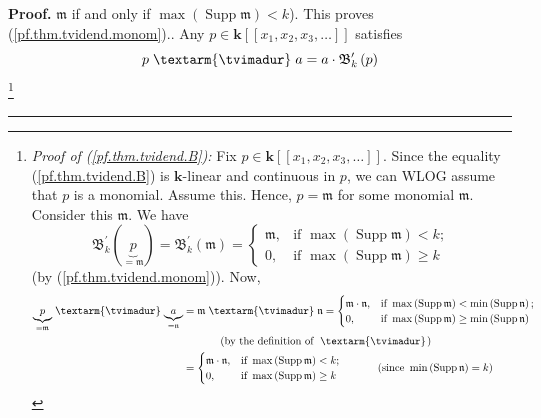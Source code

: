\documentclass
[numbers=enddot,12pt,final,onecolumn,notitlepage,abstracton]{scrartcl}%
\theoremstyle{definition}
\newenvironment{proof}[1][Proof]{\noindent\textbf{#1.} }{\ \rule{0.5em}{0.5em}}
\newenvironment{verlong}{}{}
\newcommand{\tvi}{\left. \textarm{\tvimadur} \right.}
\begin{document}
\begin{verlong}
\begin{proof}
{$\mathfrak{m}$ if and only if $\max\left(  \operatorname*{Supp}\mathfrak{m}%
\right)  <k$). This proves (\ref{pf.thm.tvidend.monom}).}. Any $p\in
\mathbf{k}\left[  \left[  x_{1},x_{2},x_{3},\ldots\right]  \right]  $
satisfies%
\begin{equation}
p \tvi a=a\cdot\mathfrak{B}_{k}^{\prime}\left(  p\right)
\label{pf.thm.tvidend.B}%
\end{equation}
\footnote{\textit{Proof of (\ref{pf.thm.tvidend.B}):} Fix $p\in\mathbf{k}%
\left[  \left[  x_{1},x_{2},x_{3},\ldots\right]  \right]  $. Since the
equality (\ref{pf.thm.tvidend.B}) is $\mathbf{k}$-linear and continuous in
$p$, we can WLOG assume that $p$ is a monomial. Assume this. Hence,
$p=\mathfrak{m}$ for some monomial $\mathfrak{m}$. Consider this
$\mathfrak{m}$. We have%
\begin{equation}
\mathfrak{B}_{k}^{\prime}\left(  \underbrace{p}_{=\mathfrak{m}}\right)
=\mathfrak{B}_{k}^{\prime}\left(  \mathfrak{m}\right)  =
\begin{cases}
\mathfrak{m}, & \text{if }\max\left(  \operatorname*{Supp}\mathfrak{m}\right)
<k;\\
0, & \text{if }\max\left(  \operatorname*{Supp}\mathfrak{m}\right)  \geq k
\end{cases}
\label{pf.thm.tvidend.B.pf.2}%
\end{equation}
(by (\ref{pf.thm.tvidend.monom})). Now,%
\begin{align*}
\underbrace{p}_{=\mathfrak{m}} \tvi \underbrace{a}_{=\mathfrak{n}}  &
=\mathfrak{m} \tvi \mathfrak{n}=
\begin{cases}
\mathfrak{m}\cdot\mathfrak{n}, & \text{if }\max\left(  \operatorname*{Supp}%
\mathfrak{m}\right)  <\min\left(  \operatorname*{Supp}\mathfrak{n}\right)  ;\\
0, & \text{if }\max\left(  \operatorname*{Supp}\mathfrak{m}\right)  \geq
\min\left(  \operatorname*{Supp}\mathfrak{n}\right)
\end{cases}
\\
&  \ \ \ \ \ \ \ \ \ \ \left(  \text{by the definition of } \tvi \right) \\
&  =
\begin{cases}
\mathfrak{m}\cdot\mathfrak{n}, & \text{if }\max\left(  \operatorname*{Supp}%
\mathfrak{m}\right)  <k;\\
0, & \text{if }\max\left(  \operatorname*{Supp}\mathfrak{m}\right)  \geq k
\end{cases}
\ \ \ \ \ \ \ \ \ \ \left(  \text{since }\min\left(  \operatorname*{Supp}%
\mathfrak{n}\right)  =k\right) \\

\end{align*}}
\end{proof}
\end{verlong}
\end{document}
